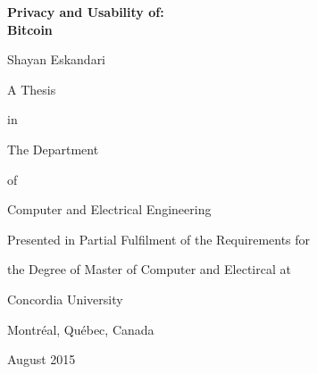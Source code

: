  \begin{titlepage}


     \vspace*{2ex}
     \begin{center}
       {\bf Privacy and Usability of:}\\
       {\bf Bitcoin}
     \end{center}
     \vspace{10ex}
     \begin{center}
	Shayan Eskandari
     \end{center}
     \vspace{11ex}
     \begin{center}
        A Thesis
     \end{center}
     \vspace*{-3ex}
     \begin{center}
        in
     \end{center}
     \vspace*{-3ex}
     \begin{center}
        The Department
     \end{center}
     \vspace*{-3ex}
     \begin{center}
        of
     \end{center}
     \vspace*{-3ex}
     \begin{center}
       Computer and Electrical Engineering 
     \end{center}
     \vspace{14ex}
     \begin{center}
        Presented in Partial Fulfilment of the Requirements for
     \end{center}
     \vspace*{-3ex}
     \begin{center}
        the Degree of Master of Computer and Electircal at
     \end{center}
     \vspace*{-3ex}
     \begin{center}
        Concordia University
     \end{center}
     \vspace*{-3ex}
     \begin{center}
        Montr\'{e}al, Qu\'{e}bec, Canada
     \end{center}
     \vspace{10ex}
     \begin{center}
        August 2015
     \end{center}
  \end{titlepage}

